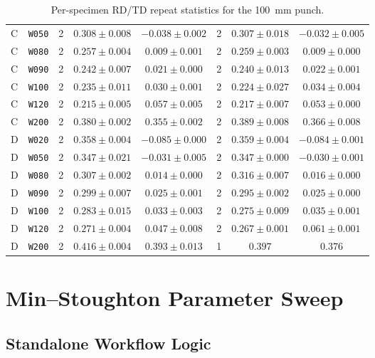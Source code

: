 \begin{table}
\begin{tabular}{llcccccc}
        C & \texttt{W050} &2 & $0.308\pm0.008$ & $-0.038\pm0.002$ & 2 & $0.307\pm0.018$ & $-0.032\pm0.005$ \\
        C & \texttt{W080} &2 & $0.257\pm0.004$ & $0.009\pm0.001$ & 2 & $0.259\pm0.003$ & $0.009\pm0.000$ \\
        C & \texttt{W090} &2 & $0.242\pm0.007$ & $0.021\pm0.000$ & 2 & $0.240\pm0.013$ & $0.022\pm0.001$ \\
        C & \texttt{W100} &2 & $0.235\pm0.011$ & $0.030\pm0.001$ & 2 & $0.224\pm0.027$ & $0.034\pm0.004$ \\
        C & \texttt{W120} &2 & $0.215\pm0.005$ & $0.057\pm0.005$ & 2 & $0.217\pm0.007$ & $0.053\pm0.000$ \\
        C & \texttt{W200} &2 & $0.380\pm0.002$ & $0.355\pm0.002$ & 2 & $0.389\pm0.008$ & $0.366\pm0.008$ \\
        \midrule
        D & \texttt{W020} &2 & $0.358\pm0.004$ & $-0.085\pm0.000$ & 2 & $0.359\pm0.004$ & $-0.084\pm0.001$ \\
        D & \texttt{W050} &2 & $0.347\pm0.021$ & $-0.031\pm0.005$ & 2 & $0.347\pm0.000$ & $-0.030\pm0.001$ \\
        D & \texttt{W080} &2 & $0.307\pm0.002$ & $0.014\pm0.000$ & 2 & $0.316\pm0.007$ & $0.016\pm0.000$ \\
        D & \texttt{W090} &2 & $0.299\pm0.007$ & $0.025\pm0.001$ & 2 & $0.295\pm0.002$ & $0.025\pm0.000$ \\
        D & \texttt{W100} &2 & $0.283\pm0.015$ & $0.033\pm0.003$ & 2 & $0.275\pm0.009$ & $0.035\pm0.001$ \\
        D & \texttt{W120} &2 & $0.271\pm0.004$ & $0.047\pm0.008$ & 2 & $0.267\pm0.001$ & $0.061\pm0.001$ \\
        D & \texttt{W200} &2 & $0.416\pm0.004$ & $0.393\pm0.013$ & 1 & $0.397$ & $0.376$ \\
        \bottomrule
    \end{tabular}
    \caption{Per-specimen RD/TD repeat statistics for the \SI{100}{\milli\meter} punch.}
    \label{tab:rd_td_repeat_values}
\end{table}

\chapter{Min--Stoughton Parameter Sweep}
\label{app:ms_sweep}

\section{Standalone Workflow Logic}
\label{app:ms_workflow_logic}

